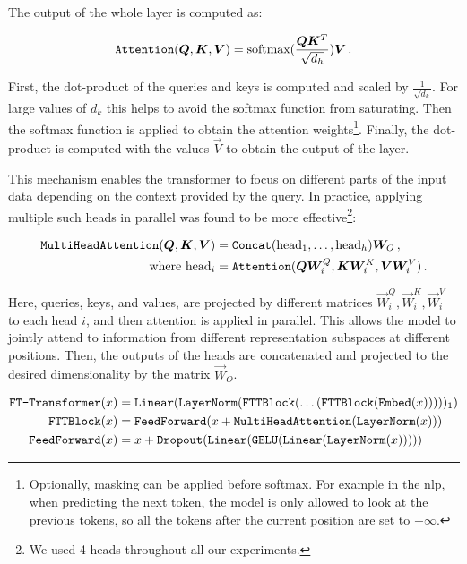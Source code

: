 The output of the whole layer is computed as:

\begin{equation}
    \texttt{Attention}({{\boldsymbol{Q}}, {\boldsymbol{K}}, {\boldsymbol{V}}}) = \text{softmax}(\frac{{\boldsymbol{Q}}{\boldsymbol{K}}^T}{\sqrt{d_h}}) {\boldsymbol{V}} \,.
\end{equation}

First, the dot-product of the queries and keys is computed and scaled by $\frac{1}{\sqrt{d_k}}$. For large values of
$d_k$ this helps to avoid the softmax function from saturating. Then the softmax function is applied to obtain the
attention weights\footnote{Optionally, masking can be applied before softmax. For example in the \gls{nlp}, when
    predicting the next token, the model is only allowed to look at the previous tokens, so all the tokens after the current
    position are set to $-\infty$.}. Finally, the dot-product is computed with the values $\vec{V}$ to obtain the output of
the layer.

This mechanism enables the transformer to focus on different parts of the input data depending on the context provided
by the query. In practice, applying multiple such heads in parallel was found to be more effective\footnote{We used 4
    heads throughout all our experiments.}:

\begin{align}
    \texttt{MultiHeadAttention}({\boldsymbol{Q}}, {\boldsymbol{K}}, {\boldsymbol{V}}) & = \texttt{Concat}(\text{head}_1, \dots, \text{head}_h) {\boldsymbol{W}}_O \,,           \\
    \text{where head}_i             & = \texttt{Attention}({\boldsymbol{Q}} {\boldsymbol{W}}_i^Q, {\boldsymbol{K}} {\boldsymbol{W}}_i^K, {\boldsymbol{V}} {\boldsymbol{W}}_i^V)\,.
\end{align}

Here, queries, keys, and values, are projected by different matrices $\vec{W}_i^Q, \vec{W}_i^K, \vec{W}_i^V$ to each
head $i$, and then attention is applied in parallel. This allows the model to jointly attend to information from
different representation subspaces at different positions. Then, the outputs of the heads are concatenated and projected
to the desired dimensionality by the matrix $\vec{W}_O$.

    {\fontsize{11}{10}\selectfont
        \begin{align}
            \label{eq:ftt}
            \texttt{FT-Transformer}(x)                 & = \texttt{Linear}(\texttt{LayerNorm}(\texttt{FTTBlock}(\dots(\texttt{FTTBlock}(\texttt{Embed}(x)))))_1) \\
            \texttt{FTTBlock}(x)            & = \texttt{FeedForward}(x + \texttt{MultiHeadAttention}(\texttt{LayerNorm}(x)))                 \\
            \texttt{FeedForward}(x) & = x + \texttt{Dropout}(\texttt{Linear}(\texttt{GELU}(\texttt{Linear}(\texttt{LayerNorm}(x)))))
        \end{align}
    }

